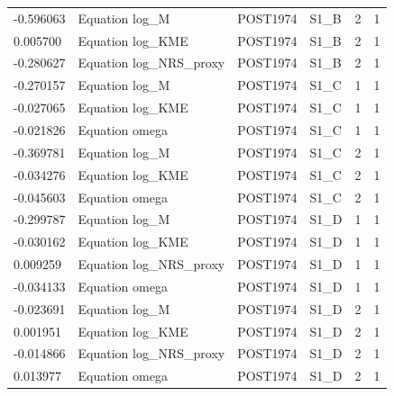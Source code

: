\begin{tabular}{llllll}
-0.596063 & Equation log\_M & POST1974 & S1\_B & 2 & 1 \\
0.005700 & Equation log\_KME & POST1974 & S1\_B & 2 & 1 \\
-0.280627 & Equation log\_NRS\_proxy & POST1974 & S1\_B & 2 & 1 \\
-0.270157 & Equation log\_M & POST1974 & S1\_C & 1 & 1 \\
-0.027065 & Equation log\_KME & POST1974 & S1\_C & 1 & 1 \\
-0.021826 & Equation omega & POST1974 & S1\_C & 1 & 1 \\
-0.369781 & Equation log\_M & POST1974 & S1\_C & 2 & 1 \\
-0.034276 & Equation log\_KME & POST1974 & S1\_C & 2 & 1 \\
-0.045603 & Equation omega & POST1974 & S1\_C & 2 & 1 \\
-0.299787 & Equation log\_M & POST1974 & S1\_D & 1 & 1 \\
-0.030162 & Equation log\_KME & POST1974 & S1\_D & 1 & 1 \\
0.009259 & Equation log\_NRS\_proxy & POST1974 & S1\_D & 1 & 1 \\
-0.034133 & Equation omega & POST1974 & S1\_D & 1 & 1 \\
-0.023691 & Equation log\_M & POST1974 & S1\_D & 2 & 1 \\
0.001951 & Equation log\_KME & POST1974 & S1\_D & 2 & 1 \\
-0.014866 & Equation log\_NRS\_proxy & POST1974 & S1\_D & 2 & 1 \\
0.013977 & Equation omega & POST1974 & S1\_D & 2 & 1 \\
\hline
\end{tabular}
